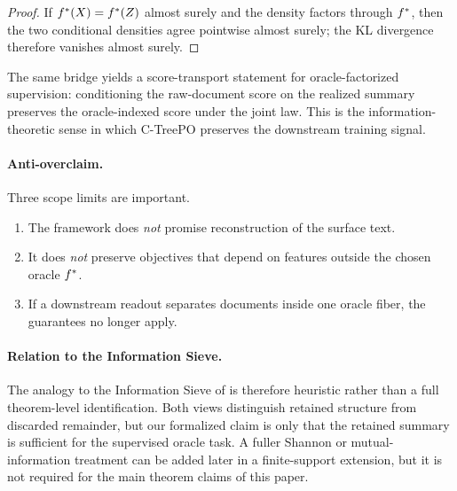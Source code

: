 \begin{proof}
If $f^{\ast}(X)=f^{\ast}(Z)$ almost surely and the density factors through
$f^{\ast}$, then the two conditional densities agree pointwise almost surely; the
KL divergence therefore vanishes almost surely.
\end{proof}

The same bridge yields a score-transport statement for oracle-factorized
supervision: conditioning the raw-document score on the realized summary
preserves the oracle-indexed score under the joint law. This is the
information-theoretic sense in which C-TreePO preserves the downstream training
signal.

\paragraph{Anti-overclaim.}
Three scope limits are important.
\begin{enumerate}[nosep]
    \item The framework does \emph{not} promise reconstruction of the surface text.
    \item It does \emph{not} preserve objectives that depend on features outside the chosen oracle $f^{\ast}$.
    \item If a downstream readout separates documents inside one oracle fiber, the guarantees no longer apply.
\end{enumerate}

\paragraph{Relation to the Information Sieve.}
The analogy to the Information Sieve of \citet{steeg2016informationsieve} is
therefore heuristic rather than a full theorem-level identification. Both views
distinguish retained structure from discarded remainder, but our formalized
claim is only that the retained summary is sufficient for the supervised oracle
task. A fuller Shannon or mutual-information treatment can be added later in a
finite-support extension, but it is not required for the main theorem claims of
this paper.
